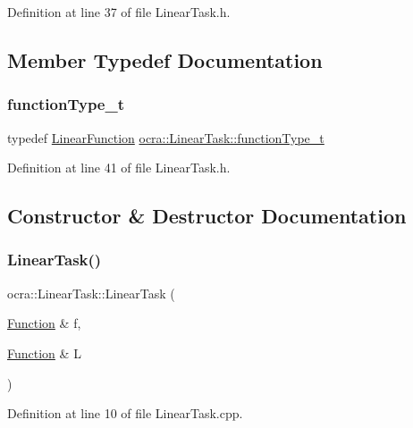 Definition at line 37 of file Linear\+Task.\+h.



\subsection{Member Typedef Documentation}
\hypertarget{classocra_1_1LinearTask_a72e12356b5513585a17c44d00d819289}{}\label{classocra_1_1LinearTask_a72e12356b5513585a17c44d00d819289} 
\subsubsection{\texorpdfstring{function\+Type\+\_\+t}{functionType\_t}}
{\footnotesize\ttfamily typedef \hyperlink{classocra_1_1LinearFunction}{Linear\+Function} \hyperlink{classocra_1_1LinearTask_a72e12356b5513585a17c44d00d819289}{ocra\+::\+Linear\+Task\+::function\+Type\+\_\+t}}



Definition at line 41 of file Linear\+Task.\+h.



\subsection{Constructor \& Destructor Documentation}
\hypertarget{classocra_1_1LinearTask_a6bbf60a2fde8bd52c79d3d26613f06a0}{}\label{classocra_1_1LinearTask_a6bbf60a2fde8bd52c79d3d26613f06a0} 
\subsubsection{\texorpdfstring{Linear\+Task()}{LinearTask()}}
{\footnotesize\ttfamily ocra\+::\+Linear\+Task\+::\+Linear\+Task (\begin{DoxyParamCaption}\item[{\hyperlink{classocra_1_1Function}{Function} \&}]{f,  }\item[{\hyperlink{classocra_1_1Function}{Function} \&}]{L }\end{DoxyParamCaption})}



Definition at line 10 of file Linear\+Task.\+cpp.

